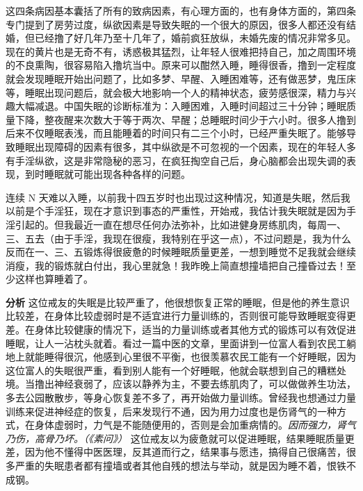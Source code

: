这四条病因基本囊括了所有的致病因素，有心理方面的，也有身体方面的，第四条专门提到了房劳过度，纵欲因素是导致失眠的一个很大的原因，很多人都还没有结婚，但已经撸了好几年乃至十几年了，婚前疯狂放纵，未婚先废的情况非常多见。现在的黄片也是无奇不有，诱惑极其猛烈，让年轻人很难把持自己，加之周围环境的不良熏陶，很容易陷入撸坑当中。原来可以酣然入睡，睡得很香，撸到一定程度就会发现睡眠开始出问题了，比如多梦、早醒、入睡困难等，还有做恶梦，鬼压床等，睡眠出现问题后，就会极大地影响一个人的精神状态，疲劳感很深，精力与兴趣大幅减退。中国失眠的诊断标准为：入睡困难，入睡时间超过三十分钟；睡眠质量下降，整夜醒来次数大于等于两次、早醒；总睡眠时间少于六小时。很多人撸到后来不仅睡眠表浅，而且能睡着的时间只有二三个小时，已经严重失眠了。能够导致睡眠出现障碍的因素有很多，其中纵欲是不可忽视的一个因素，现在的年轻人多有手淫纵欲，这是非常隐秘的恶习，在疯狂掏空自己后，身心脑都会出现失调的表现，到时睡眠就可能出现各种各样的问题。

\begin{case}
    连续 N 天难以入睡，以前我十四五岁时也出现过这种情况，知道是失眠，然后我以前是个手淫狂，现在才意识到事态的严重性，开始戒，我估计我失眠就是因为手淫引起的。但我最近一直在想尽任何办法弥补，比如进健身房练肌肉，每周一、三、五去（由于手淫，我现在很瘦，我特别在乎这一点），不过问题是，我为什么反而在一、三、五锻炼得很疲惫的时候睡眠质量更差，一想到睡觉不足我就会继续消瘦，我的锻炼就白付出，我心里就急！我昨晚上简直想撞墙把自己撞昏过去！至少这样也算睡着了。

    \textbf{分析} 这位戒友的失眠是比较严重了，他很想恢复正常的睡眠，但是他的养生意识比较差，在身体比较虚弱时是不适宜进行力量训练的，否则很可能导致睡眠变得更差。在身体比较健康的情况下，适当的力量训练或者其他方式的锻炼可以有效促进睡眠，让人一沾枕头就着。看过一篇中医的文章，里面讲到一位富人看到农民工躺地上就能睡得很沉，他感到心里很不平衡，也很羡慕农民工能有一个好睡眠，因为这位富人的失眠很严重，看到别人能有一个好睡眠，他就会联想到自己的糟糕处境。当撸出神经衰弱了，应该以静养为主，不要去练肌肉了，可以做做养生功法，多去公园散散步，等身心恢复差不多了，再开始做力量训练。曾经我也想通过力量训练来促进神经症的恢复，后来发现行不通，因为用力过度也是伤肾气的一种方式，在身体虚弱时，力气是不能随便用的，否则是会加重病情的。\textit{因而强力，肾气乃伤，高骨乃坏。（《素问》）} 这位戒友以为疲惫就可以促进睡眠，结果睡眠质量更差，因为他不懂得中医医理，反其道而行之，结果事与愿违，搞得自己很痛苦，很多严重的失眠患者都有撞墙或者其他自残的想法与举动，就是因为睡不着，恨铁不成钢。
\end{case}

